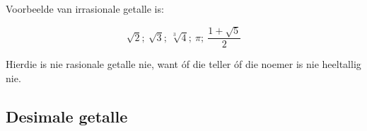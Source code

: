 Voorbeelde van irrasionale getalle is:\par 

\begin{equation*}
\sqrt{2};~\sqrt{3};~\sqrt[3]{4};~\pi ;
~\frac{1+\sqrt{5}}{2}
\end{equation*}

Hierdie is nie rasionale getalle nie, want óf die teller óf die noemer is nie heeltallig nie. 


% 


 \subsection*{Desimale getalle}
\nopagebreak

